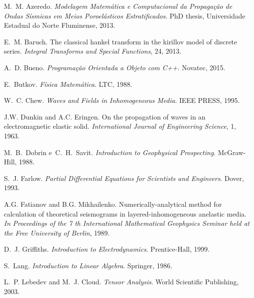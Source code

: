 \documentclass[12pt,a4paper,oneside]{abntex2}
\begin{document}
\begin{thebibliography}{25}
M.~M. Azeredo.
\newblock \emph{Modelagem Matem\'atica e Computacional da Propaga\c{c}\~ao de
  Ondas S\'ismicas em Meios Poroel\'asticos Estratificados}.
\newblock PhD thesis, Universidade Estadual do Norte Fluminense, 2013.

E.~M. Baruch.
\newblock The classical hankel transform in the kirillov model of discrete
  series.
\newblock \emph{Integral Transforms and Special Functions}, 24, 2013.

A.~D. Bueno.
\newblock \emph{Programa\c{c}\~ao Orientada a Objeto com C++}.
\newblock Novatec, 2015.

E.~Butkov.
\newblock \emph{F\'isica Matem\'atica}.
\newblock LTC, 1988.

W.~C. Chew.
\newblock \emph{Waves and Fields in Inhomogeneous Media}.
\newblock IEEE PRESS, 1995.

J.W. Dunkin and A.C. Eringen.
\newblock On the propagation of waves in an electromagnetic elastic solid.
\newblock \emph{International Journal of Engineering Science}, 1, 1963.

M.~B.~Dobrin e~C.~H.~Savit.
\newblock \emph{Introduction to Geophysical Prospecting}.
\newblock McGraw-Hill, 1988.

S.~J. Farlow.
\newblock \emph{Partial Differential Equations for Scientists and Engineers}.
\newblock Dover, 1993.

A.G. Fatianov and B.G. Mikhailenko.
\newblock Numerically-analytical method for calculation of theoretical
  seismograms in layered-inhomogeneous anelastic media.
\newblock \emph{In Proceedings of the 7 th International Mathematical
  Geophysics Seminar held at the Free University of Berlin}, 1989.

D.~J. Griffiths.
\newblock \emph{Introduction to Electrodynamics}.
\newblock Prentice-Hall, 1999.

S.~Lang.
\newblock \emph{Introduction to Linear Algebra}.
\newblock Springer, 1986.

L.~P. Lebedev and M.~J. Cloud.
\newblock \emph{Tensor Analysis}.
\newblock World Scientific Publishing, 2003.


\end{thebibliography}
\end{document}
